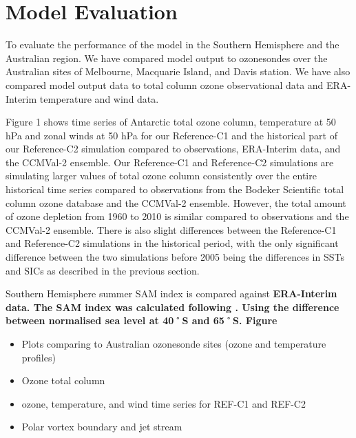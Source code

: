 \section{Model Evaluation}
To evaluate the performance of the model in the Southern Hemisphere and the Australian region. We have compared model output to ozonesondes over the Australian sites of Melbourne, Macquarie Island, and Davis station. We have also compared model output data to total column ozone observational data and ERA-Interim temperature and wind data. 

Figure 1 shows time series of Antarctic total ozone column, temperature at 50 hPa and zonal winds at 50 hPa for our Reference-C1 and the historical part of our Reference-C2 simulation compared to observations, ERA-Interim data, and the CCMVal-2 ensemble. Our Reference-C1 and Reference-C2 simulations are simulating larger values of total ozone column consistently over the entire historical time series compared to observations from the Bodeker Scientific total column ozone database and the CCMVal-2 ensemble. However, the total amount of ozone depletion from 1960 to 2010 is similar compared to observations and the CCMVal-2 ensemble. There is also slight differences between the Reference-C1 and Reference-C2 simulations in the historical period, with the only significant difference between the two simulations before 2005 being the differences in SSTs and SICs as described in the previous section.

Southern Hemisphere summer SAM index is compared against \bf{ERA-Interim} data. The SAM index was calculated following \cite{DaoyiGong:2007vm}. Using the difference between normalised sea level at 40˚S and 65˚S. Figure

\begin{itemize}
\item Plots comparing to Australian ozonesonde sites (ozone and temperature profiles)
\item Ozone total column
\item ozone, temperature, and wind time series for REF-C1 and REF-C2
\item Polar vortex boundary and jet stream
\end{itemize}